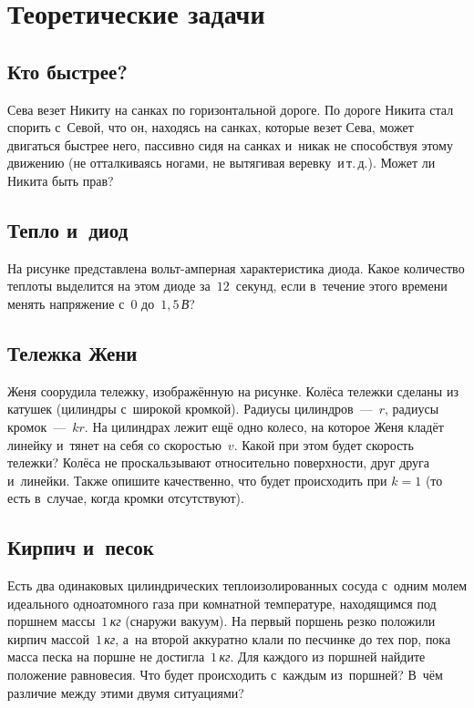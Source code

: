 \documentclass[a4paper,12pt]{article}
\newcommand\un[1]{\,\emph{#1}}
\begin{document}
\section{Теоретические задачи}

\subsection{Кто быстрее?}
Сева везет Никиту на санках по горизонтальной дороге. По дороге Никита стал спорить с~Севой,
что он, находясь на санках, которые везет Сева, может двигаться быстрее него, пассивно сидя
на санках и~никак не способствуя этому движению (не отталкиваясь ногами, не вытягивая
веревку~и\,т.\,д.). Может ли Никита быть прав?

\subsection{Тепло и~диод} На рисунке представлена вольт-амперная характеристика диода.
Какое количество теплоты выделится на этом диоде за~$12$~секунд, если в~течение этого
времени менять напряжение с~$0$ до~$ 1,5$\un{В}?



\subsection{Тележка Жени}
Женя соорудила тележку, изображённую на рисунке. Колёса тележки сделаны из катушек
(цилиндры с~широкой кромкой). Радиусы цилиндров~---~$r$, радиусы кромок~---~$kr$.
На цилиндрах лежит ещё одно колесо, на которое Женя кладёт линейку и~тянет на себя
со скоростью~$v$. Какой при этом будет скорость тележки? Колёса не проскальзывают
относительно поверхности, друг друга и~линейки. Также опишите качественно,
что будет происходить при $k = 1$ (то есть в~случае, когда кромки отсутствуют).



\subsection{Кирпич и~песок}
Есть два одинаковых цилиндрических теплоизолированных сосуда с~одним молем идеального одноатомного газа
при комнатной температуре, находящимся под поршнем массы~$1$\un{кг} (снаружи вакуум). На первый поршень
резко положили кирпич массой~$1$\un{кг}, а~на второй аккуратно клали по песчинке до тех пор, пока масса
песка на поршне не достигла~$1$\un{кг}. Для каждого из поршней найдите положение равновесия. Что будет
происходить с~каждым из~поршней? В~чём различие между этими двумя ситуациями?
\end{document}
